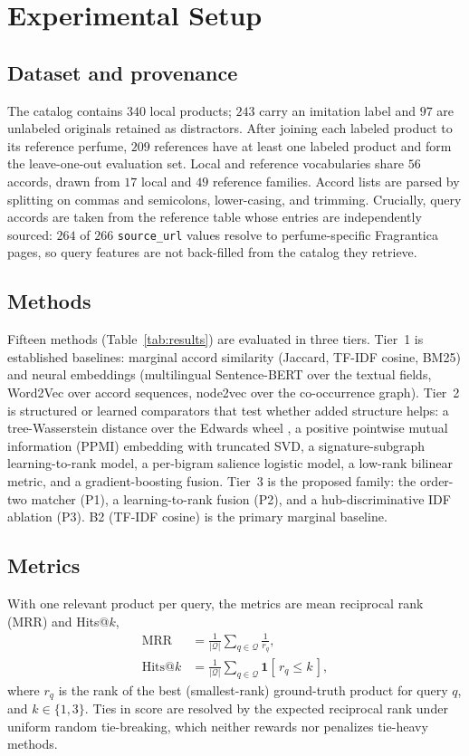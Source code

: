 \documentclass[conference]{IEEEtran}
\begin{document}
\section{Experimental Setup}\label{sec:setup}

\subsection{Dataset and provenance}
The catalog contains $340$ local products; $243$ carry an imitation label and $97$ are
unlabeled originals retained as distractors. After joining each labeled product to its
reference perfume, $209$ references have at least one labeled product and form the
leave-one-out evaluation set. Local and reference vocabularies share $56$ accords, drawn
from $17$ local and $49$ reference families. Accord lists are parsed by splitting on commas
and semicolons, lower-casing, and trimming. Crucially, query accords are taken from the
reference table whose entries are independently sourced: $264$ of $266$ \texttt{source\_url}
values resolve to perfume-specific Fragrantica pages, so query features are not back-filled
from the catalog they retrieve.

\subsection{Methods}
Fifteen methods (Table~\ref{tab:results}) are evaluated in three tiers. Tier~1 is
established baselines: marginal accord similarity (Jaccard, TF-IDF cosine, BM25) and neural
embeddings (multilingual Sentence-BERT \cite{r22} over the textual fields, Word2Vec over
accord sequences, node2vec over the co-occurrence graph). Tier~2 is structured or learned
comparators that test whether added structure helps: a tree-Wasserstein distance over the
Edwards wheel \cite{r10}, a positive pointwise mutual information (PPMI) embedding with
truncated SVD, a signature-subgraph learning-to-rank model, a per-bigram salience logistic
model, a low-rank bilinear metric, and a gradient-boosting fusion. Tier~3 is the proposed
family: the order-two matcher (P1), a learning-to-rank fusion (P2), and a hub-discriminative
IDF ablation (P3). B2 (TF-IDF cosine) is the primary marginal baseline.

\subsection{Metrics}
With one relevant product per query, the metrics are mean reciprocal rank (MRR) and Hits@$k$,
\begin{align}
\mathrm{MRR}&=\frac{1}{|\mathcal{Q}|}\sum_{q\in\mathcal{Q}}\frac{1}{r_q},\label{eq:mrr}\\
\mathrm{Hits}@k&=\frac{1}{|\mathcal{Q}|}\sum_{q\in\mathcal{Q}}\mathbf{1}[\,r_q\le k\,],\label{eq:hits}
\end{align}
where $r_q$ is the rank of the best (smallest-rank) ground-truth product for query $q$, and
$k\in\{1,3\}$. Ties in score are resolved by the expected reciprocal rank under uniform
random tie-breaking, which neither rewards nor penalizes tie-heavy methods.
\end{document}
